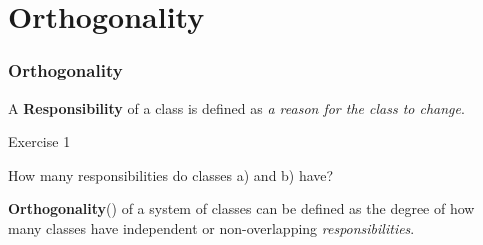 \documentclass[9pt,handout]{beamer}
\begin{document}
\section{Orthogonality}
\begin{frame}
  \frametitle{Orthogonality}
  \begin{definition}
    A \textbf{Responsibility} of a class is defined as \emph{a reason for the class to change}.
  \end{definition}
  \vfill
  \pause
  \begin{exampleblock}{Exercise 1}
    \begin{center}
      \Large
      How many responsibilities do classes a) and b) have?
    \end{center}
  \end{exampleblock}
\pause
  \vfill
  \begin{definition}
    \textbf{Orthogonality}(\cite{PP}) of a system of classes can be defined as the degree of how many classes have independent or non-overlapping \emph{responsibilities}.
  \end{definition}

\end{frame}
\end{document}
